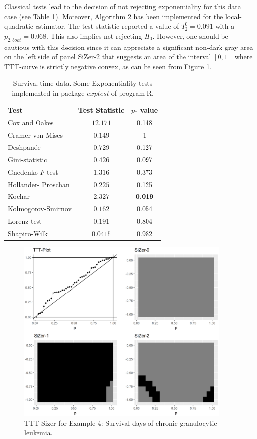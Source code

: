 \documentclass[preprint,12pt]{elsarticle}
\begin{document}
Classical tests lead to the decision of not rejecting exponentiality for this data case (see Table \ref{exp.test.granu}). Moreover, Algorithm 2 has been implemented for the local-quadratic estimator. The test statistic reported a value of $T_2^0=0.091$ with a $p_{2,boot}=0.068$. This also implies not rejecting $H_0$. However, one should be cautious with this decision since  it can appreciate a significant non-dark gray area on the left side of panel SiZer-2 that suggests an area of the interval $[0,1]$ where TTT-curve is strictly negative convex, as can be seen from Figure \ref{Fig:granu}.

\begin{table}
\centering
\caption{Survival time data. Some Exponentiality tests implemented in package $exptest$ \cite{NPY15} of program R.}
\begin{tabular}{|l|c|c|}  \hline
{\bf Test  }\cite{Ascher90} & Test Statistic & $p$-{ value}  \\ \hline
Cox and Oakes        &$ 12.171$ & 0.148 \\ \hline
Cramer-von Mises    &  $0.149$ &  1 \\ \hline
Deshpande            & $0.729$   &  0.127 \\ \hline 
Gini-statistic      & $0.426$   &  0.097 \\ \hline  
Gnedenko $F$-test  &   $1.316$     &  0.373 \\ \hline 
Hollander- Proschan  &$0.225 $ & 0.125   \\ \hline 
Kochar            &    $2.327$ & {\bf 0.019 } \\ \hline 
Kolmogorov-Smirnov &  $ 0.162$ & {0.054}  \\ \hline 
Lorenz test        &  $ 0.191$    & 0.804\\ \hline 
Shapiro-Wilk   &  $ 0.0415$ & 0.982 \\ \hline  
\end{tabular}
\label{exp.test.granu}
\end{table}

\begin{figure}[htb]
\begin{center}
\includegraphics[height= 9cm]{Fig7_granulocyticQuadraticPuntual_01}%
\caption{TTT-Sizer for Example 4: Survival days of chronic granulocytic leukemia.}\label{Fig:granu}
\end{center}
\end{figure}
%
\end{document}
